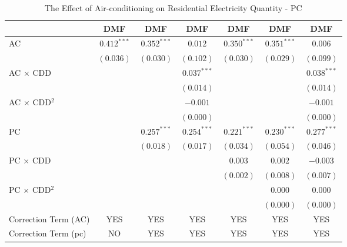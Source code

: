 
\begin{table}[htbp]
\caption{The Effect of Air-conditioning on Residential Electricity Quantity - PC}
\begin{center}
\begin{tabular}{l c c c c c c}
\hline
 & DMF & DMF & DMF & DMF & DMF & DMF \\
\hline
AC                      & $0.412^{***}$ & $0.352^{***}$ & $0.012$       & $0.350^{***}$ & $0.351^{***}$ & $0.006$       \\
                        & $(0.036)$     & $(0.030)$     & $(0.102)$     & $(0.030)$     & $(0.029)$     & $(0.099)$     \\
AC $\times$ CDD         &               &               & $0.037^{***}$ &               &               & $0.038^{***}$ \\
                        &               &               & $(0.014)$     &               &               & $(0.014)$     \\
AC $\times$ CDD$^2$     &               &               & $-0.001$      &               &               & $-0.001$      \\
                        &               &               & $(0.000)$     &               &               & $(0.000)$     \\
PC                      &               & $0.257^{***}$ & $0.254^{***}$ & $0.221^{***}$ & $0.230^{***}$ & $0.277^{***}$ \\
                        &               & $(0.018)$     & $(0.017)$     & $(0.034)$     & $(0.054)$     & $(0.046)$     \\
PC $\times$ CDD         &               &               &               & $0.003$       & $0.002$       & $-0.003$      \\
                        &               &               &               & $(0.002)$     & $(0.008)$     & $(0.007)$     \\
PC $\times$ CDD$^2$     &               &               &               &               & $0.000$       & $0.000$       \\
                        &               &               &               &               & $(0.000)$     & $(0.000)$     \\
\hline
Correction Term (AC)    & YES           & YES           & YES           & YES           & YES           & YES           \\
Correction Term (pc)    & NO            & YES           & YES           & YES           & YES           & YES           \\

\end{tabular}
\end{center}
\end{table}
